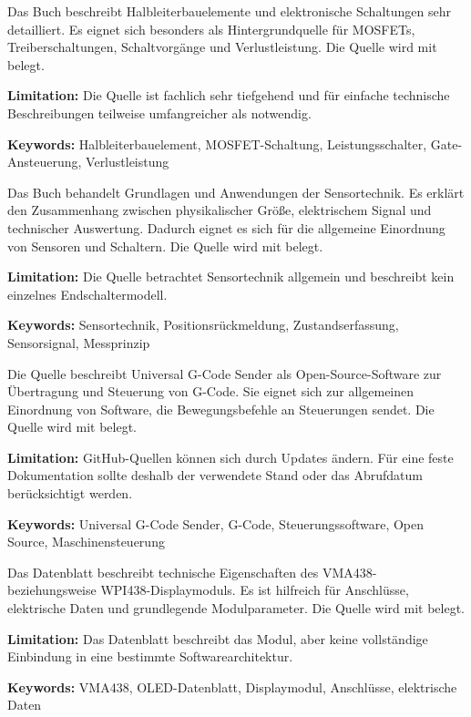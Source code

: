 
{ 
	Das Buch beschreibt Halbleiterbauelemente und elektronische Schaltungen sehr detailliert. Es eignet sich besonders als Hintergrundquelle für MOSFETs, Treiberschaltungen, Schaltvorgänge und Verlustleistung. Die Quelle wird mit \cite{Tietze:2023} belegt.
	
	\bigskip
	
	\textbf{Limitation:} Die Quelle ist fachlich sehr tiefgehend und für einfache technische Beschreibungen teilweise umfangreicher als notwendig.
	
	\scriptsize{\textbf{Keywords:} Halbleiterbauelement, MOSFET-Schaltung, Leistungsschalter, Gate-Ansteuerung, Verlustleistung}
}



{ 
	Das Buch behandelt Grundlagen und Anwendungen der Sensortechnik. Es erklärt den Zusammenhang zwischen physikalischer Größe, elektrischem Signal und technischer Auswertung. Dadurch eignet es sich für die allgemeine Einordnung von Sensoren und Schaltern. Die Quelle wird mit \cite{traenkler:2014} belegt.
	
	\bigskip
	
	\textbf{Limitation:} Die Quelle betrachtet Sensortechnik allgemein und beschreibt kein einzelnes Endschaltermodell.
	
	\scriptsize{\textbf{Keywords:} Sensortechnik, Positionsrückmeldung, Zustandserfassung, Sensorsignal, Messprinzip}
}



{ 
	Die Quelle beschreibt Universal G-Code Sender als Open-Source-Software zur Übertragung und Steuerung von G-Code. Sie eignet sich zur allgemeinen Einordnung von Software, die Bewegungsbefehle an Steuerungen sendet. Die Quelle wird mit \cite{ugs:github} belegt.
	
	\bigskip
	
	\textbf{Limitation:} GitHub-Quellen können sich durch Updates ändern. Für eine feste Dokumentation sollte deshalb der verwendete Stand oder das Abrufdatum berücksichtigt werden.
	
	\scriptsize{\textbf{Keywords:} Universal G-Code Sender, G-Code, Steuerungssoftware, Open Source, Maschinensteuerung}
}



{ 
	Das Datenblatt beschreibt technische Eigenschaften des VMA438- beziehungsweise WPI438-Displaymoduls. Es ist hilfreich für Anschlüsse, elektrische Daten und grundlegende Modulparameter. Die Quelle wird mit \cite{Velleman:VMA438Datasheet} belegt.
	
	\bigskip
	
	\textbf{Limitation:} Das Datenblatt beschreibt das Modul, aber keine vollständige Einbindung in eine bestimmte Softwarearchitektur.
	
	\scriptsize{\textbf{Keywords:} VMA438, OLED-Datenblatt, Displaymodul, Anschlüsse, elektrische Daten}
}



